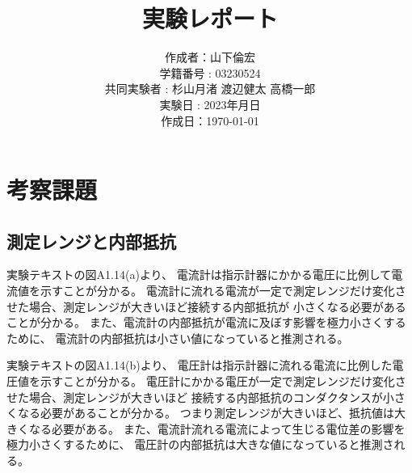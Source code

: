 \documentclass[11pt,a4paper]{ltjsarticle}
\title{実験レポート}
\date{}
\author{作成者：山下倫宏
\\ 学籍番号 : 03230524
\\ 共同実験者 : 杉山月渚 渡辺健太 高橋一郎
\\ 実験日 : 2023年月日
\\ 作成日：\today}
\begin{document}
\maketitle

\section{考察課題}
\subsection{測定レンジと内部抵抗}
実験テキスト\cite{text}の図A1.14(a)より、
電流計は指示計器にかかる電圧に比例して電流値を示すことが分かる。
電流計に流れる電流が一定で測定レンジだけ変化させた場合、測定レンジが大きいほど接続する内部抵抗が
小さくなる必要があることが分かる。
また、電流計の内部抵抗が電流に及ぼす影響を極力小さくするために、
電流計の内部抵抗は小さい値になっていると推測される。

実験テキスト\cite{text}の図A1.14(b)より、
電圧計は指示計器に流れる電流に比例した電圧値を示すことが分かる。
電圧計にかかる電圧が一定で測定レンジだけ変化させた場合、測定レンジが大きいほど
接続する内部抵抗のコンダクタンスが小さくなる必要があることが分かる。
つまり測定レンジが大きいほど、抵抗値は大きくなる必要がある。
また、電流計流れる電流によって生じる電位差の影響を極力小さくするために、
電圧計の内部抵抗は大きな値になっていると推測される。
\end{document}
